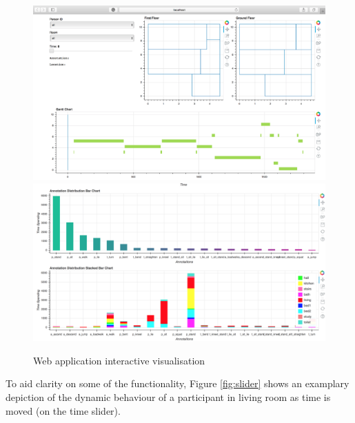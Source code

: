 \documentclass[fleqn,10pt]{SelfArx} %
\begin{document}
\begin{figure}[!h] \centering
	\includegraphics[scale=0.8]{webapp1} 
	\includegraphics[scale=0.425]{webapp2}
	\caption{Web application interactive visualisation}
	\label{fig:webapp}
\end{figure}

To aid clarity on some of the functionality, Figure \ref{fig:slider} shows an examplary depiction of the dynamic behaviour of a participant in living room as time is moved (on the time slider). \\
\end{document}

